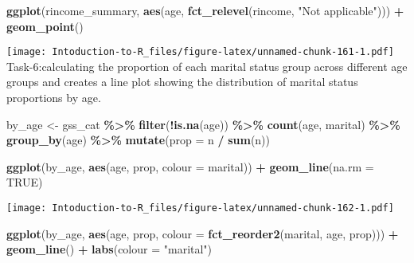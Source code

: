 \documentclass[
]{article}
\newenvironment{Shaded}{\begin{snugshade}}{\end{snugshade}}
\newcommand{\AttributeTok}[1]{\textcolor[rgb]{0.13,0.29,0.53}{#1}}
\newcommand{\ConstantTok}[1]{\textcolor[rgb]{0.56,0.35,0.01}{#1}}
\newcommand{\FunctionTok}[1]{\textcolor[rgb]{0.13,0.29,0.53}{\textbf{#1}}}
\newcommand{\NormalTok}[1]{#1}
\newcommand{\OtherTok}[1]{\textcolor[rgb]{0.56,0.35,0.01}{#1}}
\newcommand{\SpecialCharTok}[1]{\textcolor[rgb]{0.81,0.36,0.00}{\textbf{#1}}}
\newcommand{\StringTok}[1]{\textcolor[rgb]{0.31,0.60,0.02}{#1}}
\begin{document}
\begin{Shaded}
\begin{Highlighting}[]
\FunctionTok{ggplot}\NormalTok{(rincome\_summary, }\FunctionTok{aes}\NormalTok{(age, }\FunctionTok{fct\_relevel}\NormalTok{(rincome, }\StringTok{"Not applicable"}\NormalTok{))) }\SpecialCharTok{+}
  \FunctionTok{geom\_point}\NormalTok{()}
\end{Highlighting}
\end{Shaded}

\texttt{[image: Intoduction-to-R\_files/figure-latex/unnamed-chunk-161-1.pdf]}
Task-6:calculating the proportion of each marital status group across
different age groups and creates a line plot showing the distribution of
marital status proportions by age.

\begin{Shaded}
\begin{Highlighting}[]
\NormalTok{by\_age }\OtherTok{\textless{}{-}}\NormalTok{ gss\_cat }\SpecialCharTok{\%\textgreater{}\%}
  \FunctionTok{filter}\NormalTok{(}\SpecialCharTok{!}\FunctionTok{is.na}\NormalTok{(age)) }\SpecialCharTok{\%\textgreater{}\%}
  \FunctionTok{count}\NormalTok{(age, marital) }\SpecialCharTok{\%\textgreater{}\%}
  \FunctionTok{group\_by}\NormalTok{(age) }\SpecialCharTok{\%\textgreater{}\%}
  \FunctionTok{mutate}\NormalTok{(}\AttributeTok{prop =}\NormalTok{ n }\SpecialCharTok{/} \FunctionTok{sum}\NormalTok{(n))}

\FunctionTok{ggplot}\NormalTok{(by\_age, }\FunctionTok{aes}\NormalTok{(age, prop, }\AttributeTok{colour =}\NormalTok{ marital)) }\SpecialCharTok{+}
  \FunctionTok{geom\_line}\NormalTok{(}\AttributeTok{na.rm =} \ConstantTok{TRUE}\NormalTok{)}
\end{Highlighting}
\end{Shaded}

\texttt{[image: Intoduction-to-R\_files/figure-latex/unnamed-chunk-162-1.pdf]}

\begin{Shaded}
\begin{Highlighting}[]
\FunctionTok{ggplot}\NormalTok{(by\_age, }\FunctionTok{aes}\NormalTok{(age, prop, }\AttributeTok{colour =} \FunctionTok{fct\_reorder2}\NormalTok{(marital, age, prop))) }\SpecialCharTok{+}
  \FunctionTok{geom\_line}\NormalTok{() }\SpecialCharTok{+}
  \FunctionTok{labs}\NormalTok{(}\AttributeTok{colour =} \StringTok{"marital"}\NormalTok{)}
\end{Highlighting}
\end{Shaded}
\end{document}
